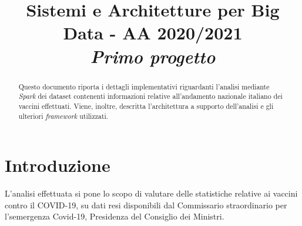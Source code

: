 \documentclass[conference]{IEEEtran}
\begin{document}
\title{Sistemi e Architetture per Big Data - AA 2020/2021 \\
	\LARGE \emph{Primo progetto}}

\author{
\and
{}

}

\maketitle

\begin{abstract}
Questo documento riporta i dettagli implementativi
riguardanti l'analisi mediante \emph{Spark} dei dataset contenenti
informazioni relative all'andamento nazionale italiano dei
vaccini effettuati. Viene, inoltre, descritta l'architettura 
a supporto dell'analisi e gli
ulteriori ​\emph{framework}​ utilizzati.
\end{abstract}

\section{\textbf{Introduzione}}
L'analisi effettuata si pone lo scopo di valutare delle
statistiche relative ai vaccini contro il COVID-19, su dati 
resi disponibili dal Commissario straordinario per l'semergenza Covid-19, 
Presidenza del Consiglio dei Ministri.\\
\end{document}
